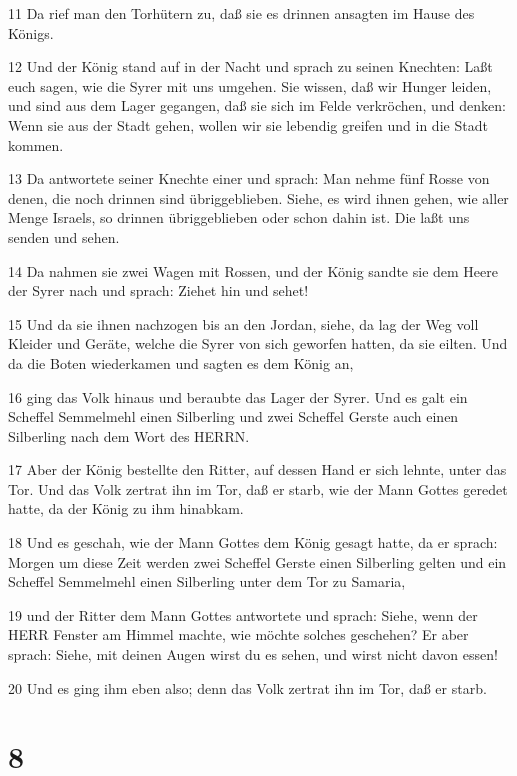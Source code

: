 \par 11 Da rief man den Torhütern zu, daß sie es drinnen ansagten im Hause des Königs.
\par 12 Und der König stand auf in der Nacht und sprach zu seinen Knechten: Laßt euch sagen, wie die Syrer mit uns umgehen. Sie wissen, daß wir Hunger leiden, und sind aus dem Lager gegangen, daß sie sich im Felde verkröchen, und denken: Wenn sie aus der Stadt gehen, wollen wir sie lebendig greifen und in die Stadt kommen.
\par 13 Da antwortete seiner Knechte einer und sprach: Man nehme fünf Rosse von denen, die noch drinnen sind übriggeblieben. Siehe, es wird ihnen gehen, wie aller Menge Israels, so drinnen übriggeblieben oder schon dahin ist. Die laßt uns senden und sehen.
\par 14 Da nahmen sie zwei Wagen mit Rossen, und der König sandte sie dem Heere der Syrer nach und sprach: Ziehet hin und sehet!
\par 15 Und da sie ihnen nachzogen bis an den Jordan, siehe, da lag der Weg voll Kleider und Geräte, welche die Syrer von sich geworfen hatten, da sie eilten. Und da die Boten wiederkamen und sagten es dem König an,
\par 16 ging das Volk hinaus und beraubte das Lager der Syrer. Und es galt ein Scheffel Semmelmehl einen Silberling und zwei Scheffel Gerste auch einen Silberling nach dem Wort des HERRN.
\par 17 Aber der König bestellte den Ritter, auf dessen Hand er sich lehnte, unter das Tor. Und das Volk zertrat ihn im Tor, daß er starb, wie der Mann Gottes geredet hatte, da der König zu ihm hinabkam.
\par 18 Und es geschah, wie der Mann Gottes dem König gesagt hatte, da er sprach: Morgen um diese Zeit werden zwei Scheffel Gerste einen Silberling gelten und ein Scheffel Semmelmehl einen Silberling unter dem Tor zu Samaria,
\par 19 und der Ritter dem Mann Gottes antwortete und sprach: Siehe, wenn der HERR Fenster am Himmel machte, wie möchte solches geschehen? Er aber sprach: Siehe, mit deinen Augen wirst du es sehen, und wirst nicht davon essen!
\par 20 Und es ging ihm eben also; denn das Volk zertrat ihn im Tor, daß er starb.

\chapter{8}

